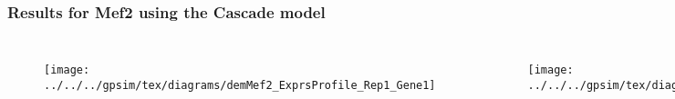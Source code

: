 \begin{frame}
  \frametitle{Results for Mef2 using the Cascade model}
  \begin{columns}[c]


    \column{2 in}

    \begin{figure}
      \centering{} \texttt{[image: ../../../gpsim/tex/diagrams/demMef2\_ExprsProfile\_Rep1\_Gene1]} 
    \end{figure}


    \begin{figure}
      \centering{} \texttt{[image: ../../../gpsim/tex/diagrams/demMef2TF\_profile\_Rep1]}
    \end{figure}


    \centering


    \column{2 in}

    \begin{figure}
      \centering{} \texttt{[image: ../../../gpsim/tex/diagrams/demMef2\_ExprsProfile\_Rep1\_Gene2]} 
    \end{figure}


    \begin{figure}
      \centering{} \texttt{[image: ../../../gpsim/tex/diagrams/demMef2\_ExprsProfile\_Rep1\_Gene4]} 
    \end{figure}


  \end{columns}

\end{frame}

